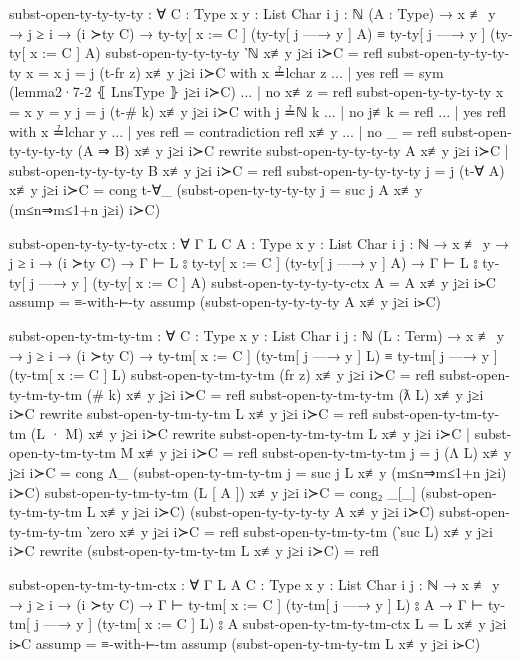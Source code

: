 \documentclass[logo,bsc,singlespacing,parskip,online]{infthesis}
\renewenvironment{code}{\mintedcopy[breaklines,breaksymbolleft=\;]{agda}}{\endmintedcopy}
\begin{document}
\begin{code}
  subst-open-ty-ty-ty-ty : ∀ {C : Type} {x y : List Char} {i j : ℕ}
    (A : Type)
    → x ≢ y
    → j ≥ i
    → (i ≻ty C)
    → ty-ty[ x := C ] (ty-ty[ j —→ y ] A)
      ≡ ty-ty[ j —→ y ] (ty-ty[ x := C ] A)
  subst-open-ty-ty-ty-ty ‵ℕ x≢y j≥i i≻C = refl
  subst-open-ty-ty-ty-ty {x = x} {j = j} (t-fr z) x≢y j≥i i≻C with x ≟lchar z
  ... | yes refl = sym (lemma2·7-2 ⦃ LnsType ⦄ j≥i i≻C)
  ... | no  x≢z  = refl
  subst-open-ty-ty-ty-ty {x = x} {y = y} {j = j} (t-# k) x≢y j≥i i≻C with j ≟ℕ k
  ... | no  j≢k  = refl
  ... | yes refl with x ≟lchar y
  ...   | yes refl = contradiction refl x≢y
  ...   | no  _    = refl
  subst-open-ty-ty-ty-ty (A ⇒ B) x≢y j≥i i≻C rewrite
      subst-open-ty-ty-ty-ty A x≢y j≥i i≻C
    | subst-open-ty-ty-ty-ty B x≢y j≥i i≻C
    = refl
  subst-open-ty-ty-ty-ty {j = j} (t-∀ A) x≢y j≥i i≻C = cong t-∀_
    (subst-open-ty-ty-ty-ty {j = suc j} A x≢y (m≤n⇒m≤1+n j≥i) i≻C)

  subst-open-ty-ty-ty-ty-ctx : ∀ {Γ L} {C A : Type} {x y : List Char} {i j : ℕ}
    → x ≢ y
    → j ≥ i
    → (i ≻ty C)
    → Γ ⊢ L ⦂ ty-ty[ x := C ] (ty-ty[ j —→ y ] A)
    → Γ ⊢ L ⦂ ty-ty[ j —→ y ] (ty-ty[ x := C ] A)
  subst-open-ty-ty-ty-ty-ctx {A = A} x≢y j≥i i≻C assump = ≡-with-⊢-ty assump (subst-open-ty-ty-ty-ty A x≢y j≥i i≻C)

  subst-open-ty-tm-ty-tm : ∀ {C : Type} {x y : List Char} {i j : ℕ}
    (L : Term)
    → x ≢ y
    → j ≥ i
    → (i ≻ty C)
    → ty-tm[ x := C ] (ty-tm[ j —→ y ] L)
      ≡ ty-tm[ j —→ y ] (ty-tm[ x := C ] L)
  subst-open-ty-tm-ty-tm (fr z) x≢y j≥i i≻C = refl
  subst-open-ty-tm-ty-tm (# k) x≢y j≥i i≻C = refl
  subst-open-ty-tm-ty-tm (ƛ L) x≢y j≥i i≻C rewrite
    subst-open-ty-tm-ty-tm L x≢y j≥i i≻C = refl
  subst-open-ty-tm-ty-tm (L · M) x≢y j≥i i≻C rewrite
      subst-open-ty-tm-ty-tm L x≢y j≥i i≻C
    | subst-open-ty-tm-ty-tm M x≢y j≥i i≻C
    = refl
  subst-open-ty-tm-ty-tm {j = j} (Λ L) x≢y j≥i i≻C = cong Λ_
    (subst-open-ty-tm-ty-tm {j = suc j} L x≢y (m≤n⇒m≤1+n j≥i) i≻C)
  subst-open-ty-tm-ty-tm (L [ A ]) x≢y j≥i i≻C = cong₂ _[_]
    (subst-open-ty-tm-ty-tm L x≢y j≥i i≻C)
    (subst-open-ty-ty-ty-ty A x≢y j≥i i≻C)
  subst-open-ty-tm-ty-tm ‵zero x≢y j≥i i≻C = refl
  subst-open-ty-tm-ty-tm (‵suc L) x≢y j≥i i≻C rewrite
    (subst-open-ty-tm-ty-tm L x≢y j≥i i≻C) = refl

  subst-open-ty-tm-ty-tm-ctx : ∀ {Γ L A} {C : Type} {x y : List Char} {i j : ℕ}
    → x ≢ y
    → j ≥ i
    → (i ≻ty C)
    → Γ ⊢ ty-tm[ x := C ] (ty-tm[ j —→ y ] L) ⦂ A
    → Γ ⊢ ty-tm[ j —→ y ] (ty-tm[ x := C ] L) ⦂ A
  subst-open-ty-tm-ty-tm-ctx {L = L} x≢y j≥i i≻C assump = ≡-with-⊢-tm assump (subst-open-ty-tm-ty-tm L x≢y j≥i i≻C)


\end{code}
\end{document}
